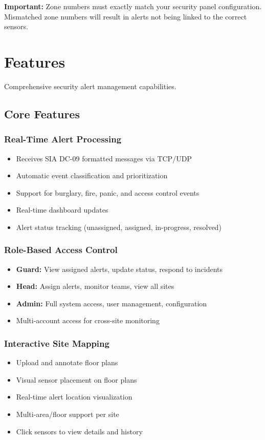 \documentclass[12pt,a4paper]{article}
\begin{document}
\textbf{Important:} Zone numbers must exactly match your security panel configuration. Mismatched zone numbers will result in alerts not being linked to the correct sensors.

\section{Features}

Comprehensive security alert management capabilities.

\subsection{Core Features}

\subsubsection{Real-Time Alert Processing}
\begin{itemize}
\item Receives SIA DC-09 formatted messages via TCP/UDP
\item Automatic event classification and prioritization
\item Support for burglary, fire, panic, and access control events
\item Real-time dashboard updates
\item Alert status tracking (unassigned, assigned, in-progress, resolved)
\end{itemize}

\subsubsection{Role-Based Access Control}
\begin{itemize}
\item \textbf{Guard:} View assigned alerts, update status, respond to incidents
\item \textbf{Head:} Assign alerts, monitor teams, view all sites
\item \textbf{Admin:} Full system access, user management, configuration
\item Multi-account access for cross-site monitoring
\end{itemize}

\subsubsection{Interactive Site Mapping}
\begin{itemize}
\item Upload and annotate floor plans
\item Visual sensor placement on floor plans
\item Real-time alert location visualization
\item Multi-area/floor support per site
\item Click sensors to view details and history
\end{itemize}
\end{document}
